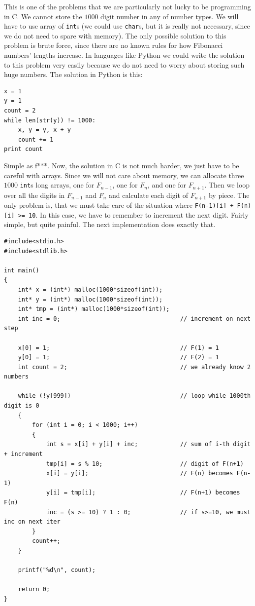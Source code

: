 \documentclass{book}
\begin{document}
This is one of the problems that we are particularly not lucky to be programming in C. We cannot store the $1000$ digit number in any of number types. We will have to use array of \texttt{int}s (we could use \texttt{char}s, but it is really not necessary, since we do not need to spare with memory). The only possible solution to this problem is brute force, since there are no known rules for how Fibonacci numbers' lengths increase. In languages like Python we could write the solution to this problem very easily because we do not need to worry about storing such huge numbers. The solution in Python is this:

\begin{verbatim}
x = 1
y = 1
count = 2
while len(str(y)) != 1000:
    x, y = y, x + y
    count += 1
print count
\end{verbatim}

Simple as f***. Now, the solution in C is not much harder, we just have to be careful with arrays. Since we will not care about memory, we can allocate three $1000$ \texttt{int}s long arrays, one for $F_{n-1}$, one for $F_n$, and one for $F_{n+1}$. Then we loop over all the digits in $F_{n-1}$ and $F_n$ and calculate each digit of $F_{n+1}$ by piece. The only problem is, that we must take care of the situation where \texttt{F(n-1)[i] + F(n)[i] >= 10}. In this case, we have to remember to increment the next digit. Fairly simple, but quite painful. The next implementation does exactly that.

\begin{verbatim}
#include<stdio.h>
#include<stdlib.h>

int main()
{
    int* x = (int*) malloc(1000*sizeof(int));
    int* y = (int*) malloc(1000*sizeof(int));
    int* tmp = (int*) malloc(1000*sizeof(int));
    int inc = 0;                                  // increment on next step

    x[0] = 1;                                     // F(1) = 1
    y[0] = 1;                                     // F(2) = 1
    int count = 2;                                // we already know 2 numbers

    while (!y[999])                               // loop while 1000th digit is 0
    {
        for (int i = 0; i < 1000; i++)
        {
            int s = x[i] + y[i] + inc;            // sum of i-th digit + increment
            tmp[i] = s % 10;                      // digit of F(n+1)
            x[i] = y[i];                          // F(n) becomes F(n-1)
            y[i] = tmp[i];                        // F(n+1) becomes F(n)
            inc = (s >= 10) ? 1 : 0;              // if s>=10, we must inc on next iter
        }
        count++;
    }

    printf("%d\n", count);

    return 0;
}
\end{verbatim}
\end{document}
